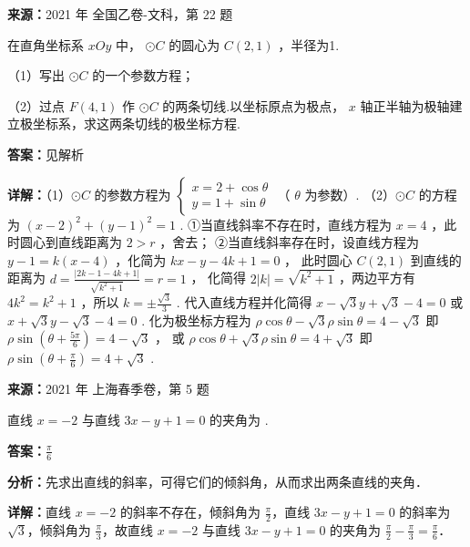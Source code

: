 \begin{question}[points=10]
\textbf{来源：}2021 年 全国乙卷-文科，第 22 题\par
在直角坐标系 $xOy$ 中， $\odot C$ 的圆心为 $C(2,1)$ ，半径为1.

（1）写出 $\odot C$ 的一个参数方程；

（2）过点 $F(4,1)$ 作 $\odot C$ 的两条切线.以坐标原点为极点， $x$ 轴正半轴为极轴建立极坐标系，求这两条切线的极坐标方程.
\begin{solution}
\textbf{答案：}见解析

\textbf{详解：}（1）$\odot C$ 的参数方程为 $\begin{cases} x = 2 + \cos\theta \\ y = 1 + \sin\theta \end{cases}$ （ $\theta$ 为参数）.
（2）$\odot C$ 的方程为 $(x-2)^2 + (y-1)^2 = 1$ .
①当直线斜率不存在时，直线方程为 $x=4$ ，此时圆心到直线距离为 $2 > r$ ，舍去；
②当直线斜率存在时，设直线方程为 $y-1 = k(x-4)$ ，化简为 $kx - y - 4k + 1 = 0$ ，
此时圆心 $C(2,1)$ 到直线的距离为 $d = \frac{|2k - 1 - 4k + 1|}{\sqrt{k^2+1}} = r = 1$ ，
化简得 $2|k| = \sqrt{k^2+1}$ ，两边平方有 $4k^2 = k^2 + 1$ ，所以 $k = \pm\frac{\sqrt{3}}{3}$ .
代入直线方程并化简得 $x - \sqrt{3}y + \sqrt{3} - 4 = 0$ 或 $x + \sqrt{3}y - \sqrt{3} - 4 = 0$ .
化为极坐标方程为 $\rho\cos\theta - \sqrt{3}\rho\sin\theta = 4 - \sqrt{3}$ 即 $\rho\sin(\theta + \frac{5\pi}{6}) = 4 - \sqrt{3}$ ，
或 $\rho\cos\theta + \sqrt{3}\rho\sin\theta = 4 + \sqrt{3}$ 即 $\rho\sin(\theta + \frac{\pi}{6}) = 4 + \sqrt{3}$ .
\end{solution}
\end{question}

\begin{question}[points=4]
\textbf{来源：}2021 年 上海春季卷，第 5 题\par
直线 $x=-2$ 与直线 $3x-y+1=0$ 的夹角为  .
\fillin[{$\frac{\pi}{6}$}]
\begin{solution}
\textbf{答案：}$\frac{\pi}{6}$

\textbf{分析：}先求出直线的斜率，可得它们的倾斜角，从而求出两条直线的夹角．

\textbf{详解：}直线 $x=-2$ 的斜率不存在，倾斜角为 $\frac{\pi}{2}$，直线 $3x-y+1=0$ 的斜率为 $\sqrt{3}$，倾斜角为 $\frac{\pi}{3}$，故直线 $x=-2$ 与直线 $3x-y+1=0$ 的夹角为 $\frac{\pi}{2}-\frac{\pi}{3}=\frac{\pi}{6}$．
\end{solution}
\end{question}


